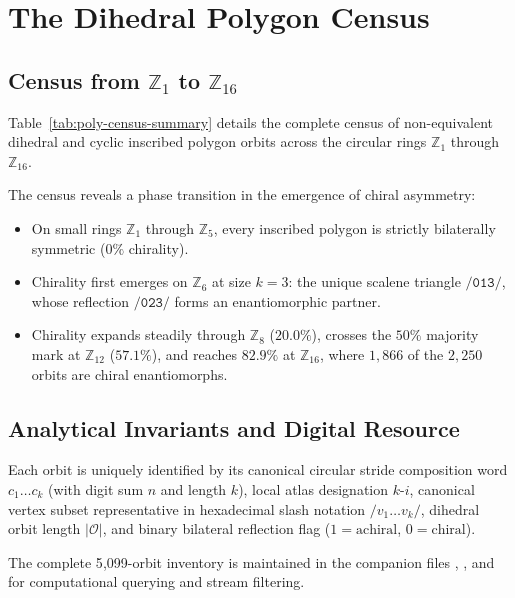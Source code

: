 \chapter{The Dihedral Polygon Census}
\label{chap:harmonic-taxonomy}

\section{Census from \texorpdfstring{$\mathbb{Z}_1$ to $\mathbb{Z}_{16}$}{Z1 to Z16}}

Table~\ref{tab:poly-census-summary} details the complete census of
non-equivalent dihedral and cyclic inscribed polygon orbits across the
circular rings $\mathbb{Z}_1$ through $\mathbb{Z}_{16}$.



The census reveals a phase transition in the emergence of chiral asymmetry:
\begin{itemize}
    \item On small rings $\mathbb{Z}_1$ through $\mathbb{Z}_5$, every
    inscribed polygon is strictly bilaterally symmetric ($0\%$ chirality).
    \item Chirality first emerges on $\mathbb{Z}_6$ at size $k=3$:
    the unique scalene triangle $\texttt{/013/}$, whose reflection
    $\texttt{/023/}$ forms an enantiomorphic partner.
    \item Chirality expands steadily through $\mathbb{Z}_8$ ($20.0\%$),
    crosses the $50\%$ majority mark at $\mathbb{Z}_{12}$ ($57.1\%$),
    and reaches $82.9\%$ at $\mathbb{Z}_{16}$, where $1{,}866$ of the
    $2{,}250$ orbits are chiral enantiomorphs.
\end{itemize}

\section{Analytical Invariants and Digital Resource}

Each orbit is uniquely identified by its canonical circular stride
composition word $c_1 \dots c_k$ (with digit sum $n$ and length
$k$), local atlas designation $k\text{-}i$, canonical vertex subset
representative in hexadecimal slash notation $/v_1 \dots v_k/$, dihedral
orbit length $|\mathcal{O}|$, and binary bilateral reflection flag ($1 =
\text{achiral}$, $0 = \text{chiral}$).

The complete 5{,}099-orbit inventory is maintained in the companion
files , , and 
for computational querying and stream filtering.

